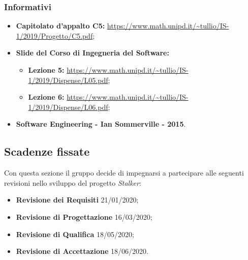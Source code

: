 \documentclass[../piano-di-progetto.tex]{subfiles}
\begin{document}
\subsubsection{Informativi}%
\label{subs:informativi}
\begin{itemize}
  \item \textbf{Capitolato d'appalto C5:} \url{https://www.math.unipd.it/~tullio/IS-1/2019/Progetto/C5.pdf};
  \item \textbf{Slide del Corso di Ingegneria del Software:} \begin{itemize}
        \item \textbf{Lezione 5:} \url{https://www.math.unipd.it/~tullio/IS-1/2019/Dispense/L05.pdf};
        \item \textbf{Lezione 6:} \url{https://www.math.unipd.it/~tullio/IS-1/2019/Dispense/L06.pdf};
  \end{itemize}
  \item  \textbf{Software Engineering - Ian Sommerville - 2015}.
\end{itemize}%
\subsection{Scadenze fissate}%
\label{sub:scadenze_fissate}
Con questa sezione il gruppo decide di impegnarsi a partecipare alle seguenti revisioni nello sviluppo del progetto \textit{Stalker}:
  \begin{itemize}
    \item \textbf{Revisione dei Requisiti} 21/01/2020;
    \item \textbf{Revisione di Progettazione} 16/03/2020;
    \item \textbf{Revisione di Qualifica} 18/05/2020;
    \item \textbf{Revisione di Accettazione} 18/06/2020.
  \end{itemize}
\end{document}
